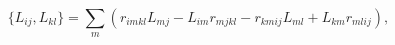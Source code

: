 \begin{equation}
\{L_{ij},L_{kl}\}=
\sum_{m}(r_{imkl}L_{mj}-L_{im}r_{mjkl}-
r_{kmij}L_{ml}+L_{km}r_{mlij}),
\label{nota1}
\end{equation}

